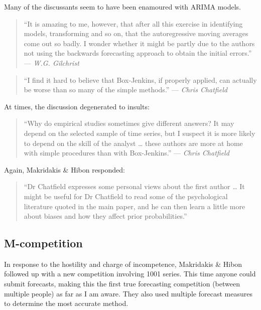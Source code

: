 \documentclass[11pt,a4paper,]{article}
\begin{document}
Many of the discussants seem to have been enamoured with ARIMA models.

\begin{quote}
``It is amazing to me, however, that after all this exercise in identifying models, transforming and so on, that the autoregressive moving averages come out so badly. I wonder whether it might be partly due to the authors not using the backwards forecasting approach to obtain the initial errors.'' --- \emph{W.G. Gilchrist}
\end{quote}

\begin{quote}
``I find it hard to believe that Box-Jenkins, if properly applied, can actually be worse than so many of the simple methods.'' --- \emph{Chris Chatfield}
\end{quote}

At times, the discussion degenerated to insults:

\begin{quote}
``Why do empirical studies sometimes give different answers? It may depend on the selected sample of time series, but I suspect it is more likely to depend on the skill of the analyst \ldots{} these authors are more at home with simple procedures than with Box-Jenkins.'' --- \emph{Chris Chatfield}
\end{quote}

Again, Makridakis \& Hibon responded:

\begin{quote}
``Dr Chatfield expresses some personal views about the first author \ldots{} It might be useful for Dr Chatfield to read some of the psychological literature quoted in the main paper, and he can then learn a little more about biases and how they affect prior probabilities.''
\end{quote}

\hypertarget{m-competition}{%
\subsection*{M-competition}\label{m-competition}}

In response to the hostility and charge of incompetence, Makridakis \& Hibon followed up with a new competition involving 1001 series. This time anyone could submit forecasts, making this the first true forecasting competition (between multiple people) as far as I am aware. They also used multiple forecast measures to determine the most accurate method.
\end{document}
